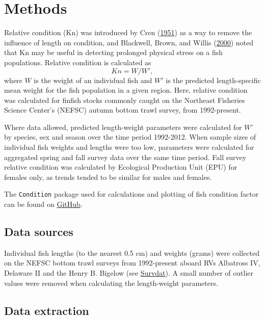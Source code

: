 \documentclass[
]{book}
\begin{document}
\hypertarget{methods-13}{%
\section{Methods}\label{methods-13}}

Relative condition (Kn) was introduced by Cren (\protect\hyperlink{ref-Cren1951a}{1951}) as a way to remove the influence of length on condition, and Blackwell, Brown, and Willis (\protect\hyperlink{ref-Blackwell2000}{2000}) noted that Kn may be useful in detecting prolonged physical stress on a fish populations. Relative condition is calculated as
\[Kn = W/W',\] where \(W\) is the weight of an individual fish and \(W'\) is the predicted length-specific mean weight for the fish population in a given region. Here, relative condition was calculated for finfish stocks commonly caught on the Northeast Fisheries Science Center's (NEFSC) autumn bottom trawl survey, from 1992-present.

Where data allowed, predicted length-weight parameters were calculated for \(W’\) by species, sex and season over the time period 1992-2012. When sample sizes of individual fish weights and lengths were too low, parameters were calculated for aggregated spring and fall survey data over the same time period. Fall survey relative condition was calculated by Ecological Production Unit (EPU) for females only, as trends tended to be similar for males and females.

The \texttt{Condition} package used for calculations and plotting of fish condition factor can be found on \href{https://github.com/Laurels1/Condition}{GitHub}.

\hypertarget{data-sources-13}{%
\subsection{Data sources}\label{data-sources-13}}

Individual fish lengths (to the nearest 0.5 cm) and weights (grams) were collected on the NEFSC bottom trawl surveys from 1992-present aboard RVs Albatross IV, Delaware II and the Henry B. Bigelow (see \protect\hyperlink{survdat}{Survdat}). A small number of outlier values were removed when calculating the length-weight parameters.

\hypertarget{data-extraction-12}{%
\subsection{Data extraction}\label{data-extraction-12}}
\end{document}
